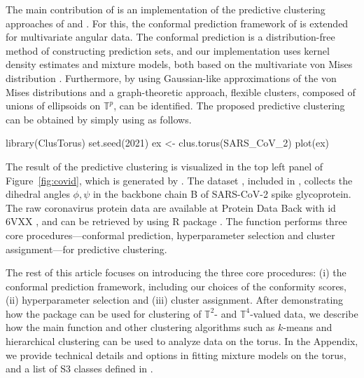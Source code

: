  The main contribution of  is an implementation of
the predictive clustering approaches of \citet{Jung:2021} and \citet{Shin:2019}. For this, the conformal prediction framework of \citet{Vovk} is extended for multivariate angular data. The conformal prediction is a distribution-free method of constructing prediction sets, and our implementation uses kernel density estimates and mixture models, both based on the multivariate von Mises distribution \citep{Mardia:2012}.
Furthermore, by using Gaussian-like approximations of the von Mises distributions and a graph-theoretic approach,
flexible clusters, composed of unions of ellipsoids on $\mathbb{T}^p$, can be identified. %
The proposed predictive clustering can be  obtained by simply using  as follows.
 \begin{example}
library(ClusTorus)
set.seed(2021)
ex <- clus.torus(SARS_CoV_2)
plot(ex)
 \end{example}
 The result of the predictive clustering is visualized in the top left panel of Figure~\ref{fig:covid}, which is generated by .  The dataset , included in ,  collects the dihedral angles $\phi,\psi$ in the  backbone chain B of SARS-CoV-2 spike glycoprotein. The raw coronavirus protein data are available at Protein Data Back with id  6VXX \citep{Walls:2020}, and can be retrieved by using R package . %
 The function  performs three core procedures---conformal prediction, hyperparameter selection and cluster assignment---for predictive clustering.

The rest of this article focuses on introducing the three core procedures: (i) the conformal prediction framework, including our choices of the conformity scores, (ii) hyperparameter selection and (iii) cluster assignment. After demonstrating how the package  can be used for clustering of $\mathbb{T}^2$- and $\mathbb{T}^4$-valued data, we describe how the main function  and other clustering algorithms such as $k$-means and hierarchical clustering can be used to analyze data
on the torus.
In the Appendix, we provide technical details and options in fitting mixture models on the torus, and a list of S3 classes defined in . 

